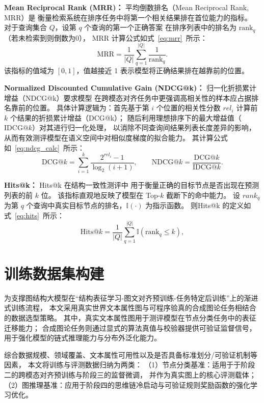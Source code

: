\textbf{Mean Reciprocal Rank (MRR)：}
平均倒数排名（Mean Reciprocal Rank, MRR）是
衡量检索系统在排序任务中将第一个相关结果排在首位能力的指标。
对于查询集合 $Q$，设第 $q$ 个查询的第一个正确答案
在排序列表中的排名为 $\text{rank}_q$（若未检索到则倒数为0），
MRR 计算公式如式~\ref{eq:mrr}\ 所示：
\begin{equation}
\mathrm{MRR} = \frac{1}{|Q|} \sum_{q=1}^{|Q|} \frac{1}{\text{rank}_q}.
\label{eq:mrr}
\end{equation}
该指标的值域为 $[0, 1]$，值越接近 1 表示模型将正确结果排在越靠前的位置。

\textbf{Normalized Discounted Cumulative Gain (NDCG@k)：}
归一化折损累计增益（NDCG@k）要求模型
在跨模态对齐任务中更强调高相关性的样本应占据排名靠前的位置。
具体计算逻辑为：首先基于第 $i$ 个位置的相关性分数 $rel_i$
计算前 $k$ 个结果的折损累计增益（DCG@k）；
随后利用理想排序下的最大增益值（$\mathrm{IDCG}@k$）对其进行归一化处理，
以消除不同查询间结果列表长度差异的影响，
从而有效测评模型在语义空间中对相似度梯度的拟合能力。
其计算公式如~\ref{eq:ndcg_calc}\ 所示：
\begin{equation}
\mathrm{DCG}@k = \sum_{i=1}^{k} \frac{2^{rel_i} - 1}{\log_2(i+1)}, \qquad
\mathrm{NDCG}@k = \frac{\mathrm{DCG}@k}{\mathrm{IDCG}@k}.
\label{eq:ndcg_calc}
\end{equation}

\textbf{Hits@k：}
Hits@k 在结构一致性测评中
用于衡量正确的目标节点是否出现在预测列表的前 $k$ 位。
该指标直观地反映了模型在 Top-$k$ 截断下的命中能力。
设 $rank_q$ 为第 $q$ 个查询中真实目标节点的排名，$\mathbb{I}(\cdot)$ 为指示函数。
则Hits@k 的定义如式~\ref{eq:hits}\ 所示：
\begin{equation}
\mathrm{Hits}@k = \frac{1}{|Q|} \sum_{q=1}^{|Q|} \mathbb{I}(\text{rank}_q \leq k),
\label{eq:hits}
\end{equation}

\section{训练数据集构建}

为支撑图结构大模型在“结构表征学习-图文对齐预训练-任务特定后训练”上的渐进式训练流程，
本文采用{真实世界文本属性图}与{可程序验真的合成图论任务}相结合的数据选型策略。
其中，真实文本属性图用于测评模型在节点分类任务中的表征迁移能力；
合成图论任务则通过显式的算法真值与校验器提供可验证监督信号，
用于强化模型的链式推理能力与分布外泛化能力。

综合数据规模、领域覆盖、文本属性可用性以及是否具备标准划分/可验证机制等因素，
本文将训练与评测数据归纳为两类：
（1）节点分类基准：适用于于阶段二的跨模态对齐预训练与阶段三的监督微调，
并作为真实图上的核心评测载体；
（2）图推理基准：应用于阶段四的思维链冷启动与可验证规则奖励函数的强化学习优化。

